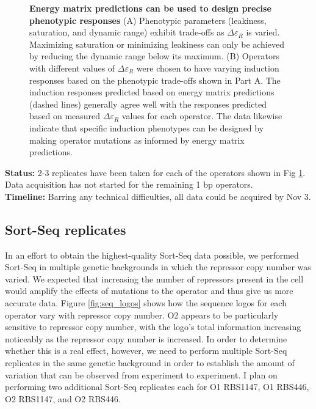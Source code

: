 \documentclass[10pt,letterpaper]{article}
\begin{document}
\begin{figure}[ht!]
\begin{center}
\caption{\textbf{Energy matrix predictions can be used to design precise
phenotypic responses} (A) Phenotypic parameters (leakiness, saturation, and dynamic
range) exhibit trade-offs as $\Delta \varepsilon_R$ is varied. Maximizing
saturation or minimizing leakiness can only be achieved by reducing the dynamic
range below its maximum. (B) Operators with different values of $\Delta
\varepsilon_R$ were chosen to have varying induction responses based on the
phenotypic trade-offs shown in Part A. The induction responses predicted based
on energy matrix predictions (dashed lines) generally agree well with the
responses predicted based on measured $\Delta \varepsilon_R$ values for each
operator. The data likewise indicate that specific induction phenotypes can be
designed by making operator mutations as informed by energy matrix predictions.}
\label{fig:designed_induction}
\end{center}
\end{figure}

\noindent \textbf{Status:} 2-3 replicates have been taken for each of the
operators shown in Fig \ref{fig:designed_induction}. Data acquisition has not
started for the remaining 1 bp operators.\\

\noindent \textbf{Timeline:} Barring any technical difficulties, all data could
be acquired by Nov 3.

\subsection*{Sort-Seq replicates}

In an effort to obtain the highest-quality Sort-Seq data possible, we performed
Sort-Seq in multiple genetic backgrounds in which the repressor copy number was
varied. We expected that increasing the number of repressors present in the cell
would amplify the effects of mutations to the operator and thus give us more
accurate data. Figure \ref{fig:seq_logos} shows how the sequence logos for each
operator vary with repressor copy number. O2 appears to be particularly
sensitive to repressor copy number, with the logo's total information
increasing noticeably as the repressor copy number is increased. In order to
determine whether this is a real effect, however, we need to perform multiple
Sort-Seq replicates in the same genetic background in order to establish the
amount of variation that can be observed from experiment to experiment. I plan
on performing two additional Sort-Seq replicates each for O1 RBS1147,
O1 RBS446, O2 RBS1147, and O2 RBS446.  \\
\end{document}
